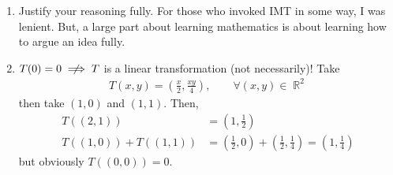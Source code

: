\documentclass[answers,11pt]{exam}
\theoremstyle{definition}
\DeclareMathOperator{\R}{\mathbb{R}}
\DeclareMathOperator{\1}{\mathbbm{1}}
\begin{document}
\begin{enumerate}
\begin{itemize}
		
	\end{itemize}
	
	
	\item Justify your reasoning fully. For those who invoked IMT in some way, I was lenient. But, a large part about learning mathematics is about learning how to argue an idea fully.
	
	
	
	\item $T(0) = 0 \centernot\implies T$ is a linear transformation (not necessarily)! Take
	\begin{align*}
	T(x,y) = \left( \frac{x}{2}, \frac{xy}{4} \right), \qquad \forall (x,y) \in \R^2
	\end{align*}
	then take $(1,0)$ and $(1,1)$. Then,
	\begin{align*}
	T((2,1)) &= \left( 1, \frac{1}{2} \right) \\
	T((1,0)) + T((1,1)) &= \left( \frac{1}{2}, 0 \right) + \left( \frac{1}{2}, \frac{1}{4} \right) = \left( 1, \frac{1}{4} \right)
	\end{align*}
	but obviously $T((0,0)) = 0$.
\end{enumerate}
\end{document}
